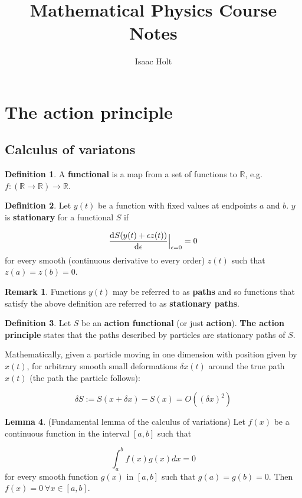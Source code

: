 \documentclass[12pt,a4paper]{article}
\title{Mathematical Physics Course Notes}
\author{Isaac Holt}
\theoremstyle{definition}
\newtheorem{definition}{Definition}[subsection]
\newtheorem{lemma}[definition]{Lemma}
\newtheorem*{remark}{Remark}
\let\oldforall\forall
\renewcommand{\forall}{\ \oldforall}
\begin{document}
\maketitle

\section{The action principle}

\subsection{Calculus of variatons}

\begin{definition}
	A \textbf{functional} is a map from a set of functions to $\mathbb{R}$, e.g. $f: (\mathbb{R} \rightarrow \mathbb{R}) \rightarrow \mathbb{R}$.
\end{definition}

\begin{definition}
	Let $y(t)$ be a function with fixed values at endpoints $a$ and $b$. $y$ is \textbf{stationary} for a functional $S$ if

	\[ \diff{S (y(t) + \epsilon z(t))}{\epsilon}\Big|_{\epsilon = 0} = 0 \]
	for every smooth (continuous derivative to every order) $z(t)$ such that $z(a) = z(b) = 0$.
\end{definition}

\begin{remark}
	Functions $y(t)$ may be referred to as \textbf{paths} and so functions that satisfy the above definition are referred to as \textbf{stationary paths}.
\end{remark}

\begin{definition}
	Let $S$ be an \textbf{action functional} (or just \textbf{action}). \textbf{The action principle} states that the paths described by particles are stationary paths of $S$.

	Mathematically, given a particle moving in one dimension with position given by $x(t)$, for arbitrary smooth small deformations $\delta x(t)$ around the true path $x(t)$ (the path the particle follows):

	\[ \delta S := S(x + \delta x) - S(x) = O({(\delta x)}^2) \]
\end{definition}

\begin{lemma}
	(Fundamental lemma of the calculus of variations) Let $f(x)$ be a continuous function in the interval $[a, b]$ such that

	\[ \int_a^b f(x) g(x) dx = 0 \]
	for every smooth function $g(x)$ in $[a, b]$ such that $g(a) = g(b) = 0$. Then $f(x) = 0 \forall x \in [a, b]$.
\end{lemma}
\end{document}
